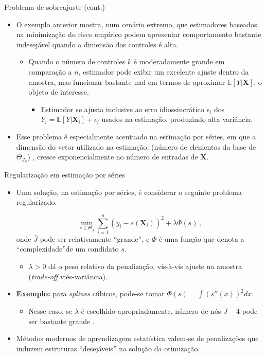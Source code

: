 \documentclass[11pt]{beamer}
\begin{document}
\begin{frame}{Problema de sobreajuste (cont.)}
	\begin{itemize}
		\item O exemplo anterior mostra, num cenário extremo, que estimadores baseados na minimização do risco empírico podem apresentar comportamento bastante indesejável quando a dimensão dos controles é alta.
		\begin{itemize}
			\item Quando o número de controles $k$ é moderadamente grande em comparação a $n$, estimador pode exibir um excelente ajuste dentro da amostra, mas funcionar bastante mal em termos de aproximar $\mathbb{E}[Y|\boldsymbol{X}]$, o objeto de interesse.
			\begin{itemize}
				\item Estimador se ajusta inclusive ao erro idiossincrático $\epsilon_i$ dos $Y_i = \mathbb{E}[Y|\boldsymbol{X}_i] + \epsilon_i$ usados na estimação, produzindo alta variância.
			\end{itemize}
			
		\end{itemize}
					\item Esse problema é especialmente acentuado na estimação por séries, em que a dimensão do vetor utilizado na estimação, (número de elementos da base de $\Theta_{J_n}$) , cresce exponencialmente no número de entradas de $\boldsymbol{X}$.
	\end{itemize}
\end{frame}

\begin{frame}{Regularização em estimação por séries}
	\begin{itemize}
		\item Uma solução, na estimação por séries, é considerar o seguinte problema regularizado.
		
		$$\min_{s \in \Theta_{\bar{J}}} \sum_{i=1}^n (y_i - s(\boldsymbol{X}_i))^2 + \lambda \Phi(s)\,, $$
			onde $\bar{J}$ pode ser relativamente ``grande'', e $\Phi$ é uma função que denota a ``complexidade''de um candidato $s$.
			\begin{itemize}
				\item $\lambda >0$ dá o peso relativo da penalização, vis-à-vis ajuste na amostra (\textit{trade-off} viés-variância).
			\end{itemize}
			\item \textbf{Exemplo:} para \textit{splines} cúbicos, pode-se tomar $\Phi(s) = \int (s''(x))^2 dx$.
			\begin{itemize}
				\item Nesse caso, se $\lambda$ é escolhido apropriadamente, número de nós $\bar{J}-4$ pode ser bastante grande \citep{Claeskens,Xiao}.
			\end{itemize}
			\item Métodos modernos de aprendizagem estatística valem-se de penalizações que induzem estruturas ``desejáveis'' na solução da otimização.  
	\end{itemize}
\end{frame}
\end{document}
